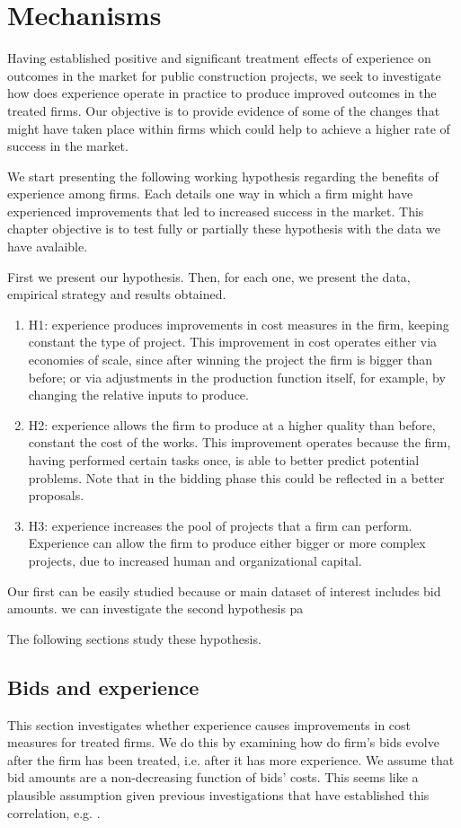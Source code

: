 \chapter{Mechanisms}
Having established positive and significant treatment effects of  experience on outcomes in the market for public construction projects, we seek to investigate how does experience operate in practice to produce improved outcomes in the treated firms. Our objective is to provide evidence of some of the changes that might have taken place within firms which could help to achieve a higher rate of success in the market.

We start presenting the following working hypothesis regarding the benefits of experience among firms. Each details one way in which a firm might have experienced improvements that led to increased success in the market. This chapter objective is to test fully or partially these hypothesis with the data we have avalaible.

First we present our hypothesis. Then, for each one, we present the data, empirical strategy and results obtained.

\begin{enumerate}
  \item{H1}: experience produces improvements in cost measures in the firm, keeping constant the type of project. This improvement in cost operates either via economies of scale, since after winning the project the firm is bigger than before; or via adjustments in the production function itself, for example, by changing the relative inputs to produce.
  \item{H2}: experience allows the firm to produce at a higher quality than before, constant the cost of the works. This improvement operates because the firm, having performed certain tasks once, is able to better predict potential problems. Note that in the bidding phase this could be reflected in a better proposals.
  \item{H3}: experience increases the pool of projects that a firm can perform. Experience can allow the firm to produce either bigger or more complex projects, due to increased human and organizational capital.
\end{enumerate}

Our first can be easily studied because or main dataset of interest includes bid amounts. we can investigate the second hypothesis pa

The following sections study these hypothesis.

\section{Bids and experience}
This section investigates whether experience causes improvements in cost measures for treated firms. We do this by examining how do firm's bids evolve after the firm has been treated, i.e. after it has more experience. We assume that bid amounts are a non-decreasing function of bids' costs. This seems like a plausible assumption given previous investigations that have established this correlation, e.g. .

